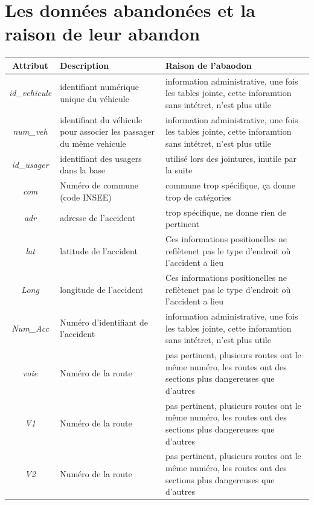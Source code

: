\documentclass{article}
\begin{document}
    \section{Les données abandonées et la raison de leur abandon}\label{appendix:dataset}
    \begin{center}
        \begin{tabular}{ |c|p{4.5cm}|p{4.5cm} }
            \hline
            \textbf{Attribut} & \textbf{Description} & \textbf{Raison de l'abaodon} \\
            \hline
            \textit{id\_vehicule} & identifiant numérique unique du véhicule & information administrative, une fois les tables jointe, cette inforamtion sans intétret, n'est plus utile\\
            \textit{num\_veh} & identifiant du véhicule pour associer les passager du même vehicule & information administrative, une fois les tables jointe, cette inforamtion sans intétret, n'est plus utile\\
            \textit{id\_usager} & identifiant des usagers dans la base & utilisé lors des jointures, inutile par la suite\\
            \textit{com} & Numéro de commune (code INSEE) & commune trop spécifique, ça donne trop de catégories\\
            \textit{adr} & adresse de l'accident & trop spécifique, ne donne rien de pertinent\\
            \textit{lat} & latitude de l'accident & Ces informations positionelles ne reflètenet pas le type d'endroit où l'accident a lieu\\
            \textit{Long} & longitude de l'accident & Ces informations positionelles ne reflètenet pas le type d'endroit où l'accident a lieu\\
            \textit{Num\_Acc} & Numéro d'identifiant de l'accident & information administrative, une fois les tables jointe, cette inforamtion sans intétret, n'est plus utile\\
            \textit{voie} & Numéro de la route & pas pertinent, plusieurs routes ont le même numéro, les routes ont des sections plus dangereuses que d'autres\\
            \textit{V1} & Numéro de la route & pas pertinent, plusieurs routes ont le même numéro, les routes ont des sections plus dangereuses que d'autres\\
            \textit{V2} & Numéro de la route & pas pertinent, plusieurs routes ont le même numéro, les routes ont des sections plus dangereuses que d'autres\\

\end{tabular}
\end{center}
\end{document}
